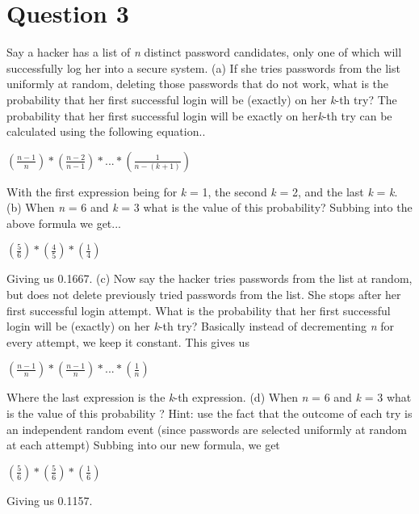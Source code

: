 \documentclass[12pt]{report}
\begin{document}
\section{Question 3}
Say a hacker has a list of \textit{n} distinct password candidates, only one of which will successfully log her into a secure system.
\newline
\newline
(a) If she tries passwords from the list uniformly at random, deleting those passwords that do not work, what is the probability that her first successful login will be (exactly) on her \textit{k}-th try?
\newline
The probability that her first successful login will be exactly on her\textit{k}-th try can be calculated using the following equation..
\begin{center}
$(\frac{\textit{n}-1}{\textit{n}}) * (\frac{\textit{n}-2}{\textit{n}-1}) * ... * (\frac{1}{\textit{n} - (\textit{k}+1)})$
\end{center}
With the first expression being for \textit{k} = 1, the second \textit{k} = 2, and the last \textit{k} = \textit{k}.
\newline
\newline
(b) When \textit{n} = 6 and \textit{k} = 3 what is the value of this probability?
\newline
Subbing into the above formula we get...
\begin{center}
$(\frac{5}{6}) * (\frac{4}{5}) * (\frac{1}{4})$
\end{center}
Giving us 0.1667.
\newline
\newline
(c) Now say the hacker tries passwords from the list at random, but does not delete previously tried passwords from the list. She stops after her first successful login attempt. What is the probability that her first successful login will be (exactly) on her \textit{k}-th try?
\newline
Basically instead of decrementing \textit{n} for every attempt, we keep it constant. This gives us
\begin{center}
$(\frac{\textit{n}-1}{\textit{n}}) * (\frac{\textit{n}-1}{\textit{n}}) * ... * (\frac{1}{\textit{n}})$
\end{center}
Where the last expression is the \textit{k}-th expression.
\newline
\newline
(d) When \textit{n} = 6 and \textit{k} = 3 what is the value of this probability ?
\newline
Hint: use the fact that the outcome of each try is an independent random event (since passwords are selected uniformly at random at each attempt)
\newline
Subbing into our new formula, we get
\begin{center}
$(\frac{5}{6}) * (\frac{5}{6}) * (\frac{1}{6})$
\end{center}
Giving us 0.1157.
\end{document}
